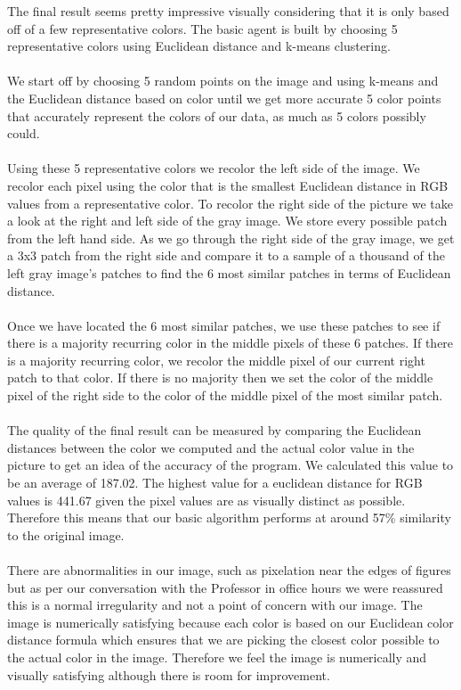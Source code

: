 \documentclass{article}
\theoremstyle{definition}
\begin{document}
 The final result seems pretty impressive visually considering that it is only based off of a few representative colors. The basic agent is built by choosing 5 representative colors using Euclidean distance and k-means clustering. \\\\
 We start off by choosing 5 random points on the image and using k-means and the Euclidean distance based on color until we get more accurate 5 color points that accurately represent the colors of our data, as much as 5 colors possibly could. \\\\
 Using these 5 representative colors we recolor the left side of the image. We recolor each pixel using the color that is the smallest Euclidean distance in RGB values from a representative color. To recolor the right side of the picture we take a look at the right and left side of the gray image. We store every possible patch from the left hand side. As we go through the right side of the gray image, we get a 3x3 patch from the right side and compare it to a sample of a thousand of the left gray image's patches to find the 6 most similar patches in terms of Euclidean distance. \\\\
 Once we have located the 6 most similar patches, we use these patches to see if there is a majority recurring color in the middle pixels of these 6 patches. If there is a majority recurring color, we recolor the middle pixel of our current right patch to that color. If there is no majority then we set the color of the middle pixel of the right side to the color of the middle pixel of the most similar patch. \\\\
 The quality of the final result can be measured by comparing the Euclidean distances between the color we computed and the actual color value in the picture to get an idea of the accuracy of the program. We calculated this value to be an average of 187.02. The highest value for a euclidean distance for RGB values is 441.67 given the pixel values are as visually distinct as possible. Therefore this means that our basic algorithm performs at around 57\% similarity to the original image.\\\\
 There are abnormalities in our image, such as pixelation near the edges of figures but as per our conversation with the Professor in office hours we were reassured this is a normal irregularity and not a point of concern with our image. The image is numerically satisfying because each color is based on our Euclidean color distance formula which ensures that we are picking the closest color possible to the actual color in the image. Therefore we feel the image is numerically and visually satisfying although there is room for improvement.
  
\end{document}

